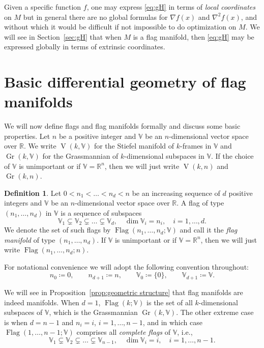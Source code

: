 \documentclass[11pt,reqno]{amsart}%
\theoremstyle{definition}
\newtheorem{definition}[theorem]{Definition}
\theoremstyle{remark}
\DeclareMathOperator{\Gr}{Gr}
\DeclareMathOperator{\V}{V}
\DeclareMathOperator{\Flag}{Flag}
\begin{document}
Given a specific function $f$, one may express \eqref{eq:gH} in terms of \emph{local coordinates} on $M$ but in general there are no global formulas for  $\nabla f(x)$ and $\nabla^2f(x)$, and without which it would be difficult if not impossible to do optimization on $M$. We will see in Section~\ref{sec:gH} that when $M$ is a flag manifold, then  \eqref{eq:gH} may be expressed globally in terms of extrinsic coordinates.


\section{Basic differential geometry of flag manifolds}\label{sec:flag}

We will now define flags and flag manifolds formally and discuss some basic properties. Let $n$ be a positive integer and $\mathbb{V}$ be an $n$-dimensional vector space over $\mathbb{R}$. We write $\V(k, \mathbb{V})$ for the Stiefel manifold \cite{Stiefel1935} of $k$-frames in $\mathbb{V}$ and $\Gr(k, \mathbb{V})$ for the Grassmannian \cite{Grass} of $k$-dimensional subspaces in $\mathbb{V}$. If the choice of $\mathbb{V}$ is unimportant or if $\mathbb{V} = \mathbb{R}^n$, then we will just write $\V(k,n)$ and $\Gr(k,n)$.
\begin{definition}
Let $0 < n_1 < \dots < n_d < n$ be an increasing sequence of $d$ positive integers and $\mathbb{V}$ be an $n$-dimensional vector space over $\mathbb{R}$. A flag of type $(n_1,\dots, n_d)$ in $\mathbb{V}$ is a sequence of subspaces 
\[
\mathbb{V}_1 \subsetneq  \mathbb{V}_2 \subsetneq \dots \subsetneq \mathbb{V}_d, \quad \dim \mathbb{V}_i = n_i,\quad i=1,\dots,d.  
\]
We denote the set of such flags by $\Flag(n_1,\dots,n_d;\mathbb{V})$ and call it  the \emph{flag manifold} of type $(n_1,\dots, n_d)$. If $\mathbb{V}$ is unimportant or if $\mathbb{V} = \mathbb{R}^n$, then we will just write $\Flag(n_1,\dots, n_d;n)$.
\end{definition}
For notational convenience we will adopt the following convention throughout:
\[
n_0 \coloneqq 0, \qquad n_{d+1} \coloneqq n, \qquad \mathbb{V}_0 \coloneqq \{0 \}, \qquad \mathbb{V}_{d+1} \coloneqq \mathbb{V}.
\]

We will see in Proposition~\ref{prop:geometric structure} that flag manifolds are indeed manifolds. When $d=1$, $\Flag(k; \mathbb{V})$ is  the set of all $k$-dimensional subspaces of $\mathbb{V}$, which is the Grassmannian $\Gr(k,\mathbb{V})$. The other extreme case is when $d= n-1$ and $n_i = i$, $i =1,\dots, n-1$, and in which case $\Flag(1,\dots, n-1;\mathbb{V})$ comprises all \emph{complete flags} of $\mathbb{V}$, i.e.,
\[
\mathbb{V}_1 \subsetneq  \mathbb{V}_2 \subsetneq \dots \subsetneq \mathbb{V}_{n-1}, \quad \dim \mathbb{V}_i = i,\quad i=1,\dots,n-1.  
\]
\end{document}
